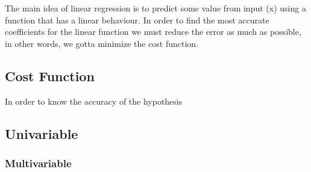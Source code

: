 The main idea of linear regression is to predict some value from input (x) using a function that has a linear behaviour. In order to find the most accurate coefficients for the linear function we must reduce the error as much as possible, in other words, we gotta minimize the cost function.

\subsection{Cost Function}
In order to know the accuracy of the hypothesis

\subsection{Univariable}


\subsubsection{Multivariable}
